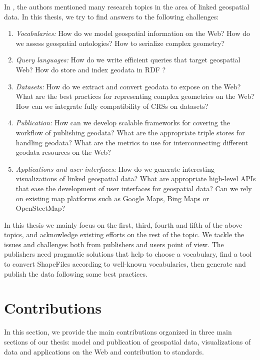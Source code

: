 In \cite{koubarakis12}, the authors mentioned many research topics in the area of linked geospatial data. In this thesis, we try to find answers to the following challenges:

\begin{enumerate}

\item \textit{Vocabularies:} How do we model geospatial information on the Web? How do we assess geospatial ontologies? How to serialize complex geometry? 
\item \textit{Query languages:} How do we write efficient queries that target geospatial Web? How do store and index geodata in RDF ?
\item \textit{Datasets:} How do we extract and convert geodata to expose on the Web? What are the best practices for representing complex geometries on the Web? How can we integrate fully compatibility of CRSs on datasets? 
\item \textit{Publication:} How can we develop scalable frameworks for covering the workflow of publishing geodata? What are the appropriate triple stores for handling geodata? What are the metrics to use for interconnecting different geodata resources on the Web?  
\item \textit{Applications and user interfaces:} How do we generate interesting visualizations of linked geospatial data? What are appropriate high-level APIs that ease the development of user interfaces for geospatial data? Can we rely on existing map platforms such as Google Maps, Bing Maps or OpenSteetMap?
\end{enumerate}

In this thesis we mainly focus on the first, third, fourth and fifth of the above topics, and acknowledge existing efforts on the rest of the topic. We tackle the issues and challenges both from publishers and users point of view. The publishers need pragmatic solutions that help to choose a vocabulary, find a tool to convert ShapeFiles according to well-known vocabularies, then generate and publish the data following some best practices.



\section{Contributions}
\label{sec:contributions}
In this section, we provide the main contributions organized in three main sections of our thesis: model and publication of geospatial data, visualizations of data and applications on the Web and contribution to standards. 

